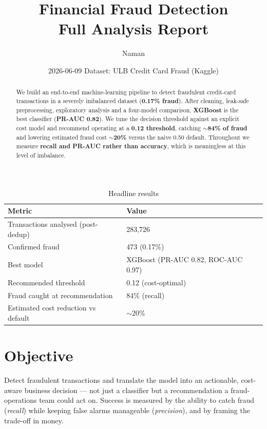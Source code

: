 \documentclass[11pt,a4paper]{article}
\title{\textbf{Financial Fraud Detection}\\[0.3em]
       \large Full Analysis Report}
\author{Naman}
\date{2026-06-09 \quad\textbar\quad Dataset: ULB Credit Card Fraud (Kaggle)}
\begin{document}
\maketitle
\thispagestyle{fancy}

\begin{abstract}
\noindent We build an end-to-end machine-learning pipeline to detect fraudulent
credit-card transactions in a severely imbalanced dataset (\textbf{0.17\% fraud}).
After cleaning, leak-safe preprocessing, exploratory analysis and a four-model
comparison, \textbf{XGBoost} is the best classifier (\textbf{PR-AUC 0.82}). We tune
the decision threshold against an explicit cost model and recommend operating at a
\textbf{0.12 threshold}, catching \textbf{$\sim$84\% of fraud} and lowering estimated
fraud cost \textbf{$\sim$20\%} versus the naive 0.50 default. Throughout we measure
\textbf{recall and PR-AUC rather than accuracy}, which is meaningless at this level
of imbalance.
\end{abstract}

\begin{table}[H]
\centering
\caption{Headline results}
\begin{tabular}{@{}ll@{}}
\toprule
\textbf{Metric} & \textbf{Value} \\
\midrule
Transactions analysed (post-dedup) & 283,726 \\
Confirmed fraud & 473 (0.17\%) \\
Best model & XGBoost (PR-AUC 0.82, ROC-AUC 0.97) \\
Recommended threshold & 0.12 (cost-optimal) \\
Fraud caught at recommendation & 84\% (recall) \\
Estimated cost reduction vs default & $\sim$20\% \\
\bottomrule
\end{tabular}
\end{table}

\clearpage
\tableofcontents
\clearpage

\section{Objective}
Detect fraudulent transactions and translate the model into an actionable,
cost-aware business decision --- not just a classifier but a recommendation a
fraud-operations team could act on. Success is measured by the ability to catch
fraud (\emph{recall}) while keeping false alarms manageable (\emph{precision}),
and by framing the trade-off in money.
\end{document}
